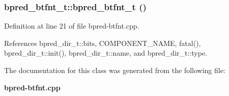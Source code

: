 \subsubsection[{bpred\_\-btfnt\_\-t}]{\setlength{\rightskip}{0pt plus 5cm}bpred\_\-btfnt\_\-t::bpred\_\-btfnt\_\-t ()\hspace{0.3cm}{\tt  [inline]}}\label{classbpred__btfnt__t_cfc7cbc380edcf82f7bdfc950f75c8dd}




Definition at line 21 of file bpred-btfnt.cpp.

References bpred\_\-dir\_\-t::bits, COMPONENT\_\-NAME, fatal(), bpred\_\-dir\_\-t::init(), bpred\_\-dir\_\-t::name, and bpred\_\-dir\_\-t::type.

The documentation for this class was generated from the following file:\begin{CompactItemize}
\item 
{\bf bpred-btfnt.cpp}\end{CompactItemize}
